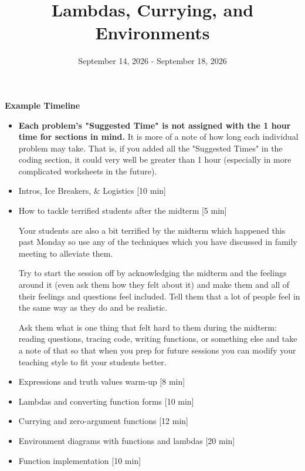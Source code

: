\documentclass{exam}
\title{Lambdas, Currying, and Environments}
\date{September 14, 2026 - September 18, 2026}
\begin{document}
\maketitle

\begin{meta}
    \textbf{Example Timeline}
    \begin{itemize}
        \item \textbf{Each problem's "Suggested Time" is not assigned with the 1 hour time for sections in mind.} It is more of a note of how long each individual problem may take. That is, if you added all the "Suggested Times" in the coding section, it could very well be greater than 1 hour (especially in more complicated worksheets in the future).
        
        \item Intros, Ice Breakers, \& Logistics [10 min]
        \item How to tackle terrified students after the midterm [5 min]
        
        Your students are also a bit terrified by the midterm which happened this past Monday so use any of the techniques which you have discussed in family meeting to alleviate them.
        
        Try to start the session off by acknowledging the midterm and the feelings around it (even ask them how they felt about it) and make them and all of their feelings and questions feel included. Tell them that a lot of people feel in the same way as they do and be realistic.
        
        Ask them what is one thing that felt hard to them during the midterm: reading questions, tracing code, writing functions, or something else and take a note of that so that when you prep for future sessions you can modify your teaching style to fit your students better.
        \item Expressions and truth values warm-up [8 min]
        \item Lambdas and converting function forms [10 min]
        \item Currying and zero-argument functions [12 min]
        \item Environment diagrams with functions and lambdas [20 min]
        \item Function implementation [10 min]
    \end{itemize}
\end{meta}
\end{document}

